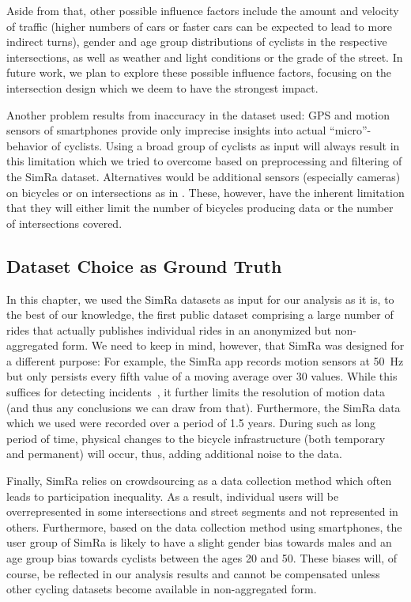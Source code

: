 Aside from that, other possible influence factors include the amount and velocity of traffic (higher numbers of cars or faster cars can be expected to lead to more indirect turns), gender and age group distributions of cyclists in the respective intersections, as well as weather and light conditions or the grade of the street.
In future work, we plan to explore these possible influence factors, focusing on the intersection design which we deem to have the strongest impact.

Another problem results from inaccuracy in the dataset used:
GPS and motion sensors of smartphones provide only imprecise insights into actual ``micro''-behavior of cyclists.
Using a broad group of cyclists as input will always result in this limitation which we tried to overcome based on preprocessing and filtering of the SimRa dataset.
Alternatives would be additional sensors (especially cameras) on bicycles or on intersections as in \cite{kaths2016integration}.
These, however, have the inherent limitation that they will either limit the number of bicycles producing data or the number of intersections covered.

\subsection{Dataset Choice as Ground Truth}
\label{subsec:dataset_choice_as_ground_truth}
In this chapter, we used the SimRa datasets as input for our analysis as it is, to the best of our knowledge, the first public dataset comprising a large number of rides that actually publishes individual rides in an anonymized but non-aggregated form.
We need to keep in mind, however, that SimRa was designed for a different purpose:
For example, the SimRa app records motion sensors at \SI{50}{\hertz} but only persists every fifth value of a moving average over 30 values.
While this suffices for detecting incidents~\cite{karakaya2020simra}, it further limits the resolution of motion data (and thus any conclusions we can draw from that).
Furthermore, the SimRa data which we used were recorded over a period of 1.5 years.
During such as long period of time, physical changes to the bicycle infrastructure (both temporary and permanent) will occur, thus, adding additional noise to the data.

Finally, SimRa relies on crowdsourcing as a data collection method which often leads to participation inequality.
As a result, individual users will be overrepresented in some intersections and street segments and not represented in others.
Furthermore, based on the data collection method using smartphones, the user group of SimRa is likely to have a slight gender bias towards males and an age group bias towards cyclists between the ages \num{20} and \num{50}.
These biases will, of course, be reflected in our analysis results and cannot be compensated unless other cycling datasets become available in non-aggregated form.

